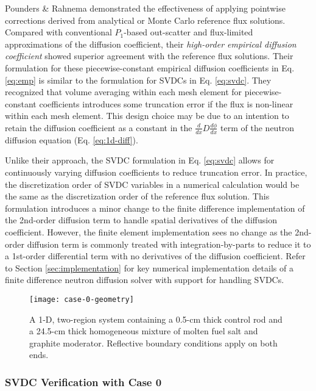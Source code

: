 Pounders \& Rahnema \cite{pounders_diffusion_2009} demonstrated the effectiveness of applying
pointwise corrections derived from analytical or Monte Carlo reference flux solutions. Compared
with conventional $P_1$-based out-scatter and flux-limited approximations of the diffusion
coefficient, their \textit{high-order empirical diffusion coefficient} showed superior agreement
with the reference flux solutions. Their formulation for these piecewise-constant empirical
diffusion coefficients in Eq. \ref{eq:emp} is similar to the formulation for \glspl{SVDC} in Eq.
\ref{eq:svdc}. They recognized that volume averaging within each mesh element for
piecewise-constant coefficients introduces some truncation error if the flux is
non-linear within each mesh element. This design choice may be due to an intention to retain the
diffusion coefficient as a constant in the $\frac{d}{dx}D\frac{d\phi}{dx}$ term of the neutron
diffusion equation (Eq. \ref{eq:1d-diff}).

Unlike their approach, the \gls{SVDC} formulation in Eq. \ref{eq:svdc} allows for continuously
varying diffusion coefficients to reduce truncation error. In practice, the discretization order of
\gls{SVDC} variables in a numerical calculation would be the same as the discretization order of
the reference flux solution. This formulation introduces a minor change to the finite difference
implementation of the 2nd-order diffusion term to handle spatial derivatives of the
diffusion coefficient. However, the finite element implementation sees no change as the 2nd-order
diffusion term is commonly treated with integration-by-parts to reduce it to a 1st-order
differential term with no derivatives of the diffusion coefficient. Refer to Section
\ref{sec:implementation} for key numerical implementation details of a finite difference neutron
diffusion solver with support for handling \glspl{SVDC}.

\begin{figure}[htb!]
  \centering
  \texttt{[image: case-0-geometry]}
  \caption{A 1-D, two-region system containing a 0.5-cm thick control rod and a 24.5-cm thick
    homogeneous mixture of molten fuel salt and graphite moderator. Reflective boundary conditions
    apply on both ends.}
  \label{fig:case-0-geom}
\end{figure}

\subsubsection{\gls{SVDC} Verification with Case 0}

